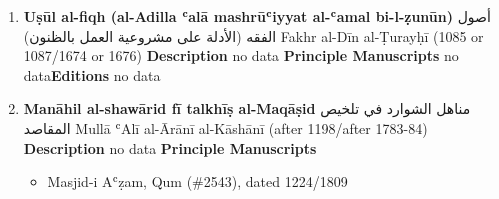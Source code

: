 \documentclass{article}
\begin{document}
\begin{enumerate}
      \item \textbf{Uṣūl al-fiqh (al-Adilla ʿalā mashrūʿiyyat al-ʿamal bi-l-ẓunūn)}
        \newline
        \textarabic{أصول الفقه (الأدلة على مشروعية العمل بالظنون)}
        \newline
        Fakhr al-Dīn al-Ṭurayḥī
        \newline
        (1085 or 1087/1674 or 1676)
        \newline
        \newline
        \textbf{Description}
        \newline	
        no data
        \newline
        \newline
    \textbf{Principle Manuscripts}
\newline
no data\newline\textbf{Editions}
\newline
no data\newline
      \item \textbf{Manāhil al-shawārid fī talkhīṣ al-Maqāṣid}
        \newline
        \textarabic{مناهل الشوارد في تلخيص المقاصد}
        \newline
        Mullā ʿAlī al-Ārānī al-Kāshānī
        \newline
        (after 1198/after 1783-84)
        \newline
        \newline
        \textbf{Description}
        \newline	
        no data
        \newline
        \newline
    \textbf{Principle Manuscripts}
\begin{itemize}
    \item Masjid-i Aʿẓam, Qum (\#2543), dated 1224/1809
    

\end{itemize}
\end{enumerate}
\end{document}
